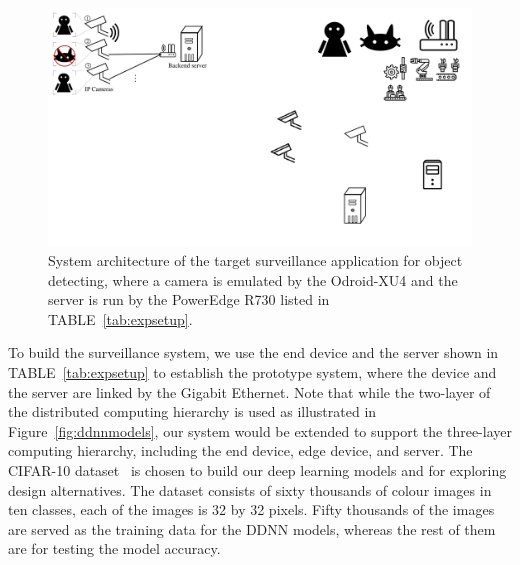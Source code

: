 \documentclass[conference]{IEEEtran}
\def\figurename{Figure}
\def\tablename{TABLE}
\begin{document}
	\begin{figure}[tbh!]
        \centering

        \includegraphics[width=.7\columnwidth]{figure/surveillancesystem.pdf}
        \caption{System architecture of the target surveillance application for object detecting, where a camera is emulated by the Odroid-XU4 and the server is run by the PowerEdge R730 listed in \tablename~\ref{tab:expsetup}.}
        \label{fig:targetsysarch} %
    \end{figure}

To build the surveillance system, we use the end device and the server shown in \tablename~\ref{tab:expsetup} to establish the prototype system, where the device and the server are linked by the Gigabit Ethernet. Note that while the two-layer of the distributed computing hierarchy is used as illustrated in \figurename~\ref{fig:ddnnmodels}, our system would be extended to support the three-layer computing hierarchy, including the end device, edge device, and server. The CIFAR-10 dataset~\cite{krizhevsky2014cifar} is chosen to build our deep learning models and for exploring design alternatives. The dataset consists of sixty thousands of colour images in ten classes, each of the images is 32 by 32 pixels. Fifty thousands of the images are served as the training data for the DDNN models, whereas the rest of them are for testing the model accuracy.
\end{document}
